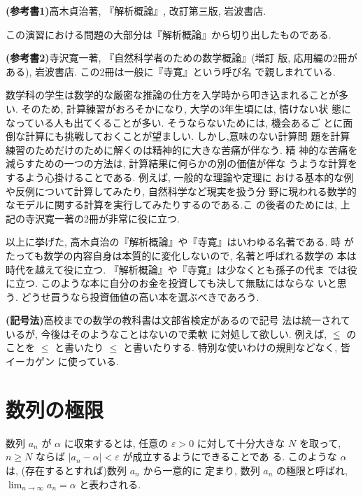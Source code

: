 \documentclass[12pt,twoside]{jarticle}
\begin{document}
\bigskip

{\bf (参考書1)}\enspace 高木貞治著, 『解析概論』, 改訂第三版, 岩波書店.

この演習における問題の大部分は『解析概論』から切り出したものである.

{\bf (参考書2)}\enspace 寺沢寛一著, 『自然科学者のための数学概論』(増訂
版, 応用編の2冊がある), 岩波書店. この2冊は一般に『寺寛』という呼び名
で親しまれている.

数学科の学生は数学的な厳密な推論の仕方を入学時から叩き込まれることが多
い. そのため, 計算練習がおろそかになり, 大学の3年生頃には, 情けない状
態になっている人も出てくることが多い. そうならないためには, 機会あるご
とに面倒な計算にも挑戦しておくことが望ましい. しかし,意味のない計算問
題を計算練習のためだけのために解くのは精神的に大きな苦痛が伴なう.  精
神的な苦痛を減らすための一つの方法は, 計算結果に何らかの別の価値が伴な
うような計算をするよう心掛けることである. 例えば, 一般的な理論や定理に
おける基本的な例や反例について計算してみたり, 自然科学など現実を扱う分
野に現われる数学的なモデルに関する計算を実行してみたりするのである.こ
の後者のためには, 上記の寺沢寛一著の2冊が非常に役に立つ.

以上に挙げた, 高木貞治の『解析概論』や『寺寛』はいわゆる名著である. 時
がたっても数学の内容自身は本質的に変化しないので, 名著と呼ばれる数学の
本は時代を越えて役に立つ. 『解析概論』や『寺寛』は少なくとも孫子の代ま
では役に立つ. このような本に自分のお金を投資しても決して無駄にはならな
いと思う. どうせ買うなら投資価値の高い本を選ぶべきであろう.

{\bf (記号法)}\enspace 高校までの数学の教科書は文部省検定があるので記号
法は統一されているが, 今後はそのようなことはないので柔軟
に対処して欲しい. 例えば, $\leqq$ のことを $\le$ と書いたり %
$\leqslant$ と書いたりする. 特別な使いわけの規則などなく, 皆イーカゲン
に使っている.


\section{数列の極限}

\begin{Definition}[数列の極限]
  数列 $a_n$ が $\alpha$ に収束するとは, 
  任意の $\varepsilon > 0$ に対して十分大きな $N$ を取って, $n \ge N$ 
  ならば $|a_n - \alpha| < \varepsilon$ が成立するようにできることであ
  る. このような $\alpha$ は, (存在するとすれば)数列 $a_n$ から一意的に
  定まり, 数列 $a_n$ の極限と呼ばれ, 
  $\displaystyle\lim_{n\to\infty}a_n=\alpha$ と表わされる.
\end{Definition}
\end{document}
